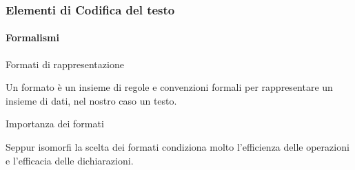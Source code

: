 \begin{frame}
	\frametitle{Elementi di Codifica del testo}
	\framesubtitle{Formalismi}
	\addtocounter{nframe}{1}

	\begin{block}{Formati di rappresentazione}
		\begin{center}
			Un formato è un insieme di regole e convenzioni formali per rappresentare un insieme di dati, nel nostro caso un testo.
		\end{center}

	\end{block}

	\begin{block}{Importanza dei formati}
		\begin{center}
			Seppur isomorfi la scelta dei formati condiziona molto l'efficienza delle operazioni e l'efficacia delle dichiarazioni.
		\end{center}

	\end{block}


\end{frame}

%   
%



